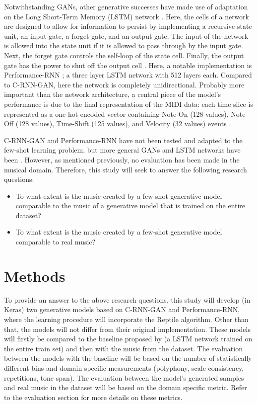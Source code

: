 Notwithstanding GANs, other generative successes have made use of adaptation on the Long Short-Term Memory (LSTM) network \parencite{hochreiter_long_1997}. Here, the cells of a network are designed to allow for information to persist by implementing a recursive state unit, an input gate, a forget gate, and an output gate. The input of the network is allowed into the state unit if it is allowed to pass through by the input gate. Next, the forget gate controls the self-loop of the state cell. Finally, the output gate has the power to shut off the output cell \parencite{goodfellow_deep_2016}. Here, a notable implementation is Performance-RNN \parencite{oore_this_2018}; a three layer LSTM network with 512 layers each. Compared to C-RNN-GAN, here the network is completely unidirectional. Probably more important than the network architecture, a central piece of the model's performance is due to the final representation of the MIDI data: each time slice is represented as a one-hot encoded vector containing Note-On (128 values), Note-Off (128 values), Time-Shift (125 values), and Velocity (32 values) events \parencite{oore_this_2018}. 

C-RNN-GAN and Performance-RNN have not been tested and adapted to the few-shot learning problem, but more general GANs and LSTM networks have been \parencite[see][]{zhang_metagan_2018, vinyals_matching_2016}. However, as mentioned previously, no evaluation has been made in the musical domain. Therefore, this study will seek to answer the following research questions:

\begin{itemize}
    \item To what extent is the music created by a few-shot generative model comparable to the music of a generative model that is trained on the entire dataset?
    \item To what extent is the music created by a few-shot generative model comparable to real music?

\end{itemize}

\chapter{Methods}

To provide an answer to the above research questions, this study will develop (in Keras) two generative models based on C-RNN-GAN and Performance-RNN, where the learning procedure will incorporate the Reptile algorithm. Other than that, the models will not differ from their original implementation. These models will firstly be compared to the baseline proposed by \textcite{larochelle_few-shot_2017} (a LSTM network trained on the entire train set) and then with the music from the dataset. The evaluation between the models with the baseline will be based on the number of statistically different bins \parencite[NDB;][]{richardson_gans_2018} and domain specific measurements (polyphony, scale consistency, repetitions, tone span). The evaluation between the model's generated samples and real music in the dataset will be based on the domain specific metric. Refer to the evaluation section for more details on these metrics.

